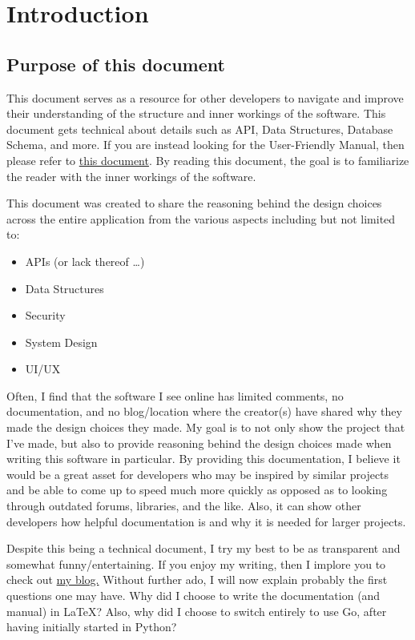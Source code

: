 \section{Introduction}

\subsection{Purpose of this document}
This document serves as a resource for other developers to navigate
and improve their understanding of the structure and inner workings
of the software. This document gets technical about details such as API, Data
Structures, Database Schema, and more.
If you are instead looking for the User-Friendly Manual, then
please refer to
\href{https://github.com/EZRA-DVLPR/GameList/blob/main/docs/PDF/Manual.pdf}{this
document}. By reading this document, the goal is to familiarize the reader with
the inner workings of the software.

This document was created to share the reasoning behind the design
choices across the entire
application from the various aspects including but not limited to:
\begin{itemize}
	\item APIs (or lack thereof \dots)
	\item Data Structures
	\item Security
	\item System Design
	\item UI/UX
\end{itemize}

Often, I find that the software I see online has limited comments, no
documentation, and no blog/location where the creator(s) have shared
why they made the design choices they made.
My goal is to not only show the project that I've made, but also to
provide reasoning behind the design choices made
when writing this software in particular. By providing this documentation, I
believe it would be a great asset for
developers who may be inspired by similar projects and be able to
come up to speed much more quickly as opposed as to looking through
outdated forums, libraries, and the like.
Also, it can show other developers how helpful
documentation is and why it is needed for larger projects.

Despite this being a technical document, I try my best to be as
transparent and somewhat funny/entertaining. If you enjoy my writing,
then I implore you to check out
\href{https://personal-website-ezra-dvlpr.vercel.app/blog}{my blog.}
Without further ado, I will now explain probably the first questions
one may have.
Why did I choose to write the documentation (and manual) in \LaTeX?
Also, why did I choose to switch entirely to use Go, after having
initially started in Python?

